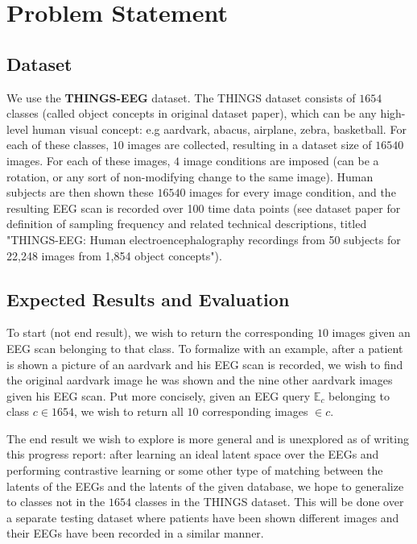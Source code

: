 \documentclass{article}
\begin{document}
\section{Problem Statement}

\subsection{Dataset}

We use the \textbf{THINGS-EEG} dataset. The THINGS dataset consists of $1654$ classes (called object concepts in original dataset paper), which can be any high-level human visual concept: e.g aardvark, abacus, airplane, zebra, basketball. For each of these classes, $10$ images are collected, resulting in a dataset size of $16540$ images. For each of these images, $4$ image conditions are imposed (can be a rotation, or any sort of non-modifying change to the same image). Human subjects are then shown these $16540$ images for every image condition, and the resulting EEG scan is recorded over 100 time data points (see dataset paper for definition of sampling frequency and related technical descriptions, titled "THINGS-EEG: Human electroencephalography recordings from 50 subjects for 22,248 images from 1,854 object concepts").

\subsection{Expected Results and Evaluation}

To start (not end result), we wish to return the corresponding $10$ images given an EEG scan belonging to that class. To formalize with an example, after a patient is shown a picture of an aardvark and his EEG scan is recorded, we wish to find the original aardvark image he was shown and the nine other aardvark images given his EEG scan. Put more concisely, given an EEG query $\mathbb{E}_c$ belonging to class $c \in 1654$, we wish to return all $10$ corresponding images $\in c$. 

The end result we wish to explore is more general and is unexplored as of writing this progress report: after learning an ideal latent space over the EEGs and performing contrastive learning or some other type of matching between the latents of the EEGs and the latents of the given database, we hope to generalize to classes not in the $1654$ classes in the THINGS dataset. This will be done over a separate testing dataset where patients have been shown different images and their EEGs have been recorded in a similar manner.  
\end{document}
